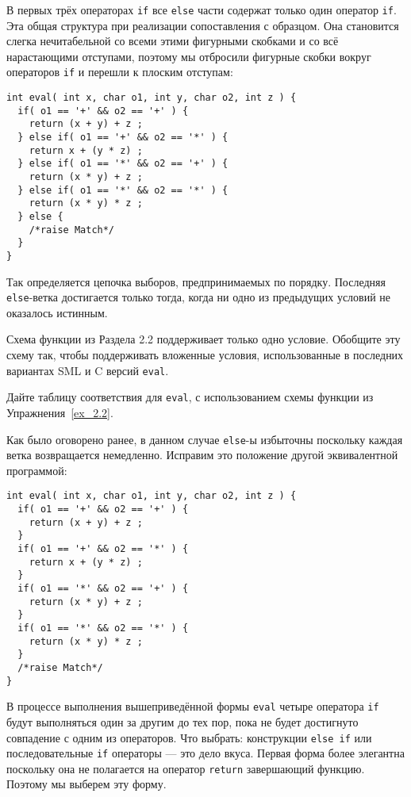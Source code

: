В первых трёх операторах \lstinline|if| все \lstinline|else| части содержат только один оператор \lstinline|if|. Эта общая структура при реализации сопоставления с образцом. Она становится слегка нечитабельной со всеми этими фигурными скобками и со всё нарастающими отступами, поэтому мы отбросили фигурные скобки вокруг операторов \lstinline|if| и перешли к плоским отступам:

\begin{lstlisting}
int eval( int x, char o1, int y, char o2, int z ) {
  if( o1 == '+' && o2 == '+' ) {
    return (x + y) + z ;
  } else if( o1 == '+' && o2 == '*' ) {
    return x + (y * z) ;
  } else if( o1 == '*' && o2 == '+' ) {
    return (x * y) + z ;
  } else if( o1 == '*' && o2 == '*' ) {
    return (x * y) * z ;
  } else {
    /*raise Match*/
  }
}
\end{lstlisting}

Так определяется цепочка выборов, предпринимаемых по порядку. Последняя \lstinline|else|-ветка достигается только тогда, когда ни одно из предыдущих условий не оказалось истинным.

\exercise Схема функции из Раздела 2.2 поддерживает только одно условие. Обобщите эту схему так, чтобы поддерживать вложенные условия, использованные в последних вариантах SML и C версий \lstinline|eval|.\label{ex_2.2}

\exercise Дайте таблицу соответствия для \lstinline|eval|, с использованием схемы функции из Упражнения~\ref{ex_2.2}.\label{ex_2.3}

Как было оговорено ранее, в данном случае \lstinline|else|-ы избыточны поскольку каждая ветка возвращается немедленно. Исправим это положение другой эквивалентной программой:

\begin{lstlisting}
int eval( int x, char o1, int y, char o2, int z ) {
  if( o1 == '+' && o2 == '+' ) {
    return (x + y) + z ;
  }
  if( o1 == '+' && o2 == '*' ) {
    return x + (y * z) ;
  }
  if( o1 == '*' && o2 == '+' ) {
    return (x * y) + z ;
  }
  if( o1 == '*' && o2 == '*' ) {
    return (x * y) * z ;
  }
  /*raise Match*/
}
\end{lstlisting}

В процессе выполнения вышеприведённой формы \lstinline|eval| четыре оператора \lstinline|if| будут выполняться один за другим до тех пор, пока не будет достигнуто совпадение с одним из операторов. Что выбрать: конструкции \lstinline|else if| или последовательные \lstinline|if| операторы --- это дело вкуса. Первая форма более элегантна поскольку она не полагается на оператор \lstinline|return| завершающий функцию. Поэтому мы выберем эту форму.

